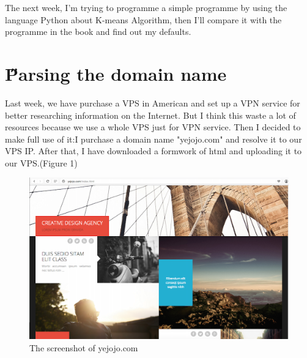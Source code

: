 \documentclass[12pt]{article}
\begin{document}
The next week, I'm trying to programme a simple programme by using the language Python about K-means Algorithm, then I'll compare it with the programme in the book and find out my defaults.

\section{\H Parsing the domain name}
Last week, we have purchase a VPS in American and set up a VPN service for better researching information on the Internet. But I think this waste a lot of resources because we use a whole VPS just for VPN service. Then I decided to make full use of it:I purchase a domain name "yejojo.com" and resolve it to our VPS IP. After that, I have downloaded a formwork of html and uploading it to our VPS.(Figure 1)
\begin{figure}[h]
\begin{center}
      \includegraphics[width=5.5in]{1}
      \caption{The screenshot of yejojo.com}	
\end{center} 
\end{figure}





\end{document}
